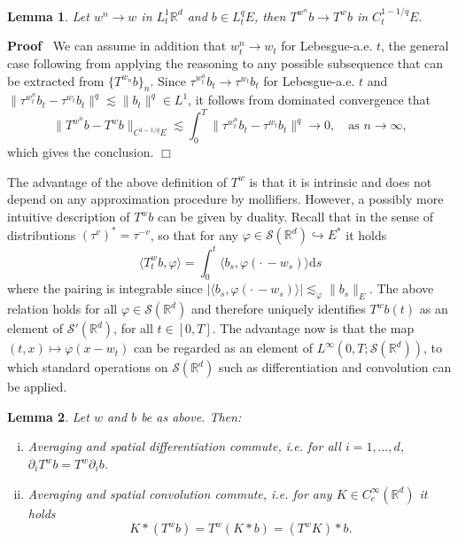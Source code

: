 \documentclass[10pt]{article}
\newcommand{\mathd}{\mathrm{d}}
\newenvironment{enumerateroman}{\begin{enumerate}[i.] }{\end{enumerate}}
\newenvironment{proof}{\noindent\textbf{Proof\ }}{\hspace*{\fill}$\Box$\medskip}
\newtheorem{lemma}{Lemma}
\begin{document}
\begin{lemma}
  \label{sec3.1 lemma 1}Let $w^n \rightarrow w$ in $L^1_t \mathbb{R}^d$ and $b
  \in L^q_t E$, then $T^{w^n} b \rightarrow T^w b$ in $C_t^{1 - 1 / q} E.$
\end{lemma}

\begin{proof}
  We can assume in addition that $w^n_t \rightarrow w_t$ for Lebesgue-a.e.
  $t$, the general case following from applying the reasoning to any possible
  subsequence that can be extracted from $\{ T^{w_n} b \}_n$. Since
  $\tau^{w^n_t} b_t \rightarrow \tau^{w_t} b_t$ for Lebesgue-a.e. $t$ and $\|
  \tau^{w^n_t} b_t - \tau^{w_t} b_t \|^q \lesssim \| b_t \|^q \in L^1$, it
  follows from dominated convergence that
  \[ \| T^{w^n} b - T^w b \|_{C^{1 - 1 / q} E} \lesssim \int_0^T \|
     \tau^{w^n_t} b_t - \tau^{w_t} b_t \|^q \rightarrow 0, \quad \text{as } n
     \rightarrow \infty, \]
  which gives the conclusion. 
\end{proof}

The advantage of the above definition of $T^w$ is that it is intrinsic and
does not depend on any approximation procedure by mollifiers. However, a
possibly more intuitive description of $T^w b$ can be given by duality. Recall
that in the sense of distributions $(\tau^v)^{\ast} = \tau^{- v}$, so that for
any $\varphi \in \mathcal{S} (\mathbb{R}^d) \hookrightarrow E^{\ast}$ it holds
\[ \langle T^w_t b, \varphi \rangle = \int_0^t \langle b_s, \varphi \left(
   \cdot \, - w_s \right) \rangle \mathd s \]
where the pairing is integrable since $\left| \langle b_s, \varphi \left(
\cdot \, - w_s \right) \rangle \right| \lesssim_{\varphi} \| b_s \|_E$. The
above relation holds for all $\varphi \in \mathcal{S} (\mathbb{R}^d)$ and
therefore uniquely identifies $T^w b (t)$ as an element of $\mathcal{S}'
(\mathbb{R}^d)$, for all $t \in [0, T]$. The advantage now is that the map
$(t, x) \mapsto \varphi (x - w_t)$ can be regarded as an element of
$L^{\infty} (0, T ; \mathcal{S} (\mathbb{R}^d))$, to which standard operations
on $\mathcal{S} (\mathbb{R}^d)$ such as differentiation and convolution can be
applied.

\begin{lemma}
  \label{sec3.1 lemma 2}Let $w$ and $b$ be as above. Then:
  \begin{enumerateroman}
    \item Averaging and spatial differentiation commute, i.e. for all $i = 1,
    \ldots, d$, $\partial_i T^w b = T^w \partial_i b$.
    
    \item Averaging and spatial convolution commute, i.e. for any $K \in
    C^{\infty}_c (\mathbb{R}^d)$ it holds
    \[ K \ast (T^w b) = T^w (K \ast b) = (T^w K) \ast b. \]
  \end{enumerateroman}
\end{lemma}
\end{document}
